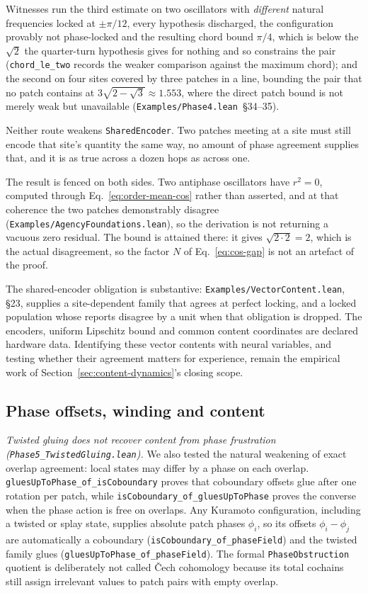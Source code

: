 \documentclass{article}
\begin{document}
Witnesses run the third estimate on two oscillators with \emph{different}
natural frequencies locked at $\pm\pi/12$, every hypothesis discharged, the
configuration provably not phase-locked and the resulting chord bound $\pi/4$,
which is below the $\sqrt2$ the quarter-turn hypothesis gives for nothing and so
constrains the pair (\nolinkurl{chord_le_two} records the weaker
comparison against the maximum chord); and the
second on four sites covered by three patches in a line, bounding the pair that
no patch contains at $3\sqrt{2-\sqrt3}\approx1.553$, where the direct patch
bound is not merely weak but unavailable
(\nolinkurl{Examples/Phase4.lean}~\S34--35).

Neither route weakens \texttt{SharedEncoder}. Two patches meeting at a site must
still encode that site's quantity the same way, no amount of phase agreement
supplies that, and it is as true across a dozen hops as across one.

The result is fenced on both sides. Two antiphase oscillators have $r^{2}=0$,
computed through Eq.~\eqref{eq:order-mean-cos} rather than asserted, and at that
coherence the two patches demonstrably disagree
(\nolinkurl{Examples/AgencyFoundations.lean}), so the derivation is not
returning a vacuous zero residual. The bound is attained there: it gives
$\sqrt{2\cdot2}=2$, which is the actual disagreement, so the factor $N$ of
Eq.~\eqref{eq:cos-gap} is not an artefact of the proof.

The shared-encoder obligation is substantive:
\nolinkurl{Examples/VectorContent.lean}, \S23, supplies a
site-dependent family that agrees at perfect locking, and a locked population
whose reports disagree by a unit when that obligation is dropped. The encoders,
uniform Lipschitz bound and common content coordinates are declared hardware
data. Identifying these vector contents with neural variables, and testing whether
their agreement matters for experience, remain the empirical work of
Section~\ref{sec:content-dynamics}'s closing scope.

\subsection{Phase offsets, winding and content}

\textit{Twisted gluing does not recover content from phase frustration (\nolinkurl{Phase5_TwistedGluing.lean}).} We also tested the natural weakening of exact overlap agreement: local states may differ by a phase on each overlap. \nolinkurl{gluesUpToPhase_of_isCoboundary} proves that coboundary offsets glue after one rotation per patch, while \nolinkurl{isCoboundary_of_gluesUpToPhase} proves the converse when the phase action is free on overlaps. Any Kuramoto configuration, including a twisted or splay state, supplies absolute patch phases $\phi_i$, so its offsets $\phi_i-\phi_j$ are automatically a coboundary (\nolinkurl{isCoboundary_of_phaseField}) and the twisted family glues (\nolinkurl{gluesUpToPhase_of_phaseField}). The formal \texttt{PhaseObstruction} quotient is deliberately not called \v{C}ech cohomology because its total cochains still assign irrelevant values to patch pairs with empty overlap.
\end{document}
